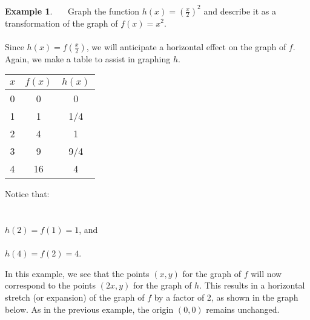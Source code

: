 \documentclass[11pt]{book}
\theoremstyle{definition}  %
\newtheorem{example}{Example}[chapter]
\begin{document}
\begin{example}~~~Graph the function $h(x)=\left(\frac{x}{2}\right)^2$ and describe it as a transformation of the graph of $f(x)=x^2$.\\
~\\
Since $h(x)=f\left(\frac{x}{2}\right)$, we will anticipate a horizontal effect on the graph of $f$.  Again, we make a table to assist in graphing $h$. 

\begin{multicols}{2}
\begin{center}
\begin{tabular}{c||c|c}
$x$ & $f(x)$ &  $h(x)$ \\
\hline
0 & 0 & 0 \\
1 & 1 &  1/4 \\
2 & 4 &  1 \\
3 & 9 &  9/4 \\
4 & 16 & 4 \\
\end{tabular}
\end{center}
Notice that:\\
~\\
~\\
$h(2)=f(1)=1$, and\\
~\\
$h(4)=f(2)=4$.
\end{multicols}
In this example, we see that the points $(x,y)$ for the graph of $f$ will now correspond to the points $(2x,y)$ for the graph of $h$.  This results in a horizontal stretch (or expansion) of the graph of $f$ by a factor of 2, as shown in the graph below.  As in the previous example, the origin $(0,0)$ remains unchanged.
\begin{center}
\end{center}
\end{example}
\end{document}
